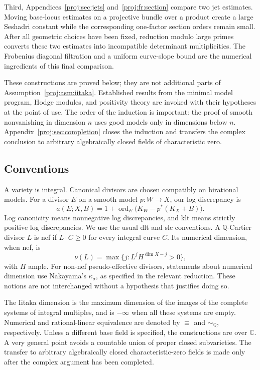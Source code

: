 \documentclass[11pt,letterpaper]{article}
\theoremstyle{definition}
\theoremstyle{remark}
\begin{document}
Third, Appendices~\ref{proj:sec:jets} and~\ref{proj:fr:section} compare two jet
estimates. Moving base-locus estimates on a projective bundle over a
product create a large Seshadri constant while the corresponding
one-factor section orders remain small. After all geometric choices
have been fixed, reduction modulo large primes converts these two
estimates into incompatible determinant multiplicities. The Frobenius
diagonal filtration and a uniform curve-slope bound are the numerical
ingredients of this final comparison.

These constructions are proved below; they are not additional parts
of Assumption~\ref{proj:asm:iitaka}. Established results from the minimal
model program, Hodge modules, and positivity theory are invoked with
their hypotheses at the point of use. The order of the induction is
important: the proof of smooth nonvanishing in dimension \(n\) uses
good models only in dimensions below \(n\).
Appendix~\ref{proj:sec:completion} closes the induction and transfers the
complex conclusion to arbitrary algebraically closed fields of
characteristic zero.

\subsection{Conventions}

A variety is integral. Canonical divisors are chosen compatibly on
birational models. For a divisor \(E\) on a smooth model
\(p:W\to X\), our log discrepancy is
\[
 a(E;X,B)=1+\operatorname{ord}_E\bigl(K_W-p^*(K_X+B)\bigr).
\]
Log canonicity means nonnegative log discrepancies, and klt means
strictly positive log discrepancies. We use the usual dlt and slc
conventions. A \(\mathbb{Q}\)-Cartier divisor \(L\) is nef if \(L\cdot C\ge0\)
for every integral curve \(C\). Its numerical dimension, when nef, is
\[
 \nu(L)=\max\{j: L^jH^{\dim X-j}>0\},
\]
with \(H\) ample. For non-nef pseudo-effective divisors, statements
about numerical dimension use Nakayama's \(\kappa_\sigma\), as
specified in the relevant reduction. These notions are not
interchanged without a hypothesis that justifies doing so.

The Iitaka dimension is the maximum dimension of the images of the
complete systems of integral multiples, and is \(-\infty\) when all
these systems are empty. Numerical and rational-linear equivalence
are denoted by \(\equiv\) and \(\sim_{\mathbb{Q}}\), respectively. Unless a
different base field is specified, the constructions are over \(\mathbb{C}\).
A very general point avoids a countable union of proper closed
subvarieties. The transfer to arbitrary algebraically closed
characteristic-zero fields is made only after the complex argument
has been completed.
\end{document}
